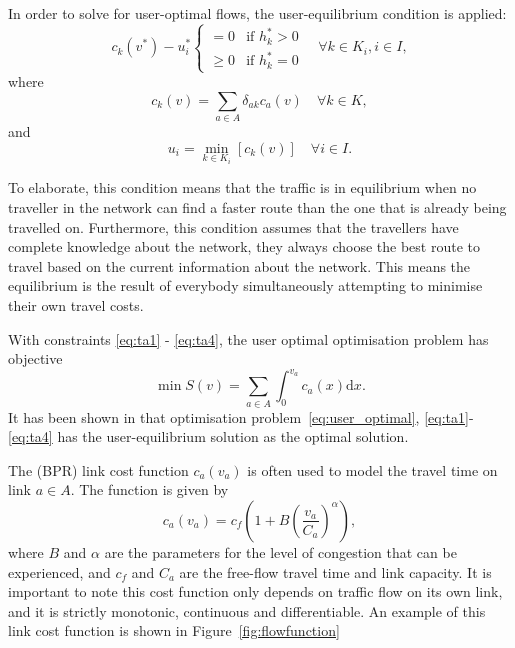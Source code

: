 In order to solve for user-optimal flows,
the \citep{Wardrop} user-equilibrium condition is applied:
\begin{equation} \label{wardrop1}
    c_k(v^{\ast}) - u_i^{\ast} 
    \begin{cases}
        =0 & \text{if } h_k^{\ast} > 0 \\
        \geq 0 & \text{if } h_k^{\ast} = 0
    \end{cases}
    \quad \forall k \in K_i, i \in I,
\end{equation}
where 
\begin{equation}
    c_k(v) = \sum_{a \in A} \delta_{ak} c_a(v) \quad \forall k \in K,
\end{equation}
and
\begin{equation} \label{wardrop3}
    u_i = \min_{k \in K_i} \left[ c_k(v) \right] \quad \forall i \in I.
\end{equation}

To elaborate, this condition means that the traffic is in equilibrium when no traveller in the network can find a faster route than the one that is already being travelled on.
Furthermore, this condition assumes that the travellers have complete knowledge about the network,
they always choose the best route to travel based on the current information about the network.
This means the equilibrium is the result of everybody simultaneously attempting to minimise their own travel costs.

With constraints \eqref{eq:ta1} - \eqref{eq:ta4},
the user optimal optimisation problem has objective
\begin{equation} \label{eq:user_optimal}
    \min S(v) = \sum_{a\in A} \int_0^{v_a} c_a(x) \mathrm{d} x.
\end{equation}
It has been shown in \citet{Florian} that optimisation problem~\eqref{eq:user_optimal}, \eqref{eq:ta1}-\eqref{eq:ta4} has the user-equilibrium solution as the optimal solution.

The \citet{BPR} (BPR) link cost function
$c_a(v_a)$ is often used to model the travel time on link $a \in A$.
The function is given by
\begin{equation}
    c_a(v_a) = c_f \left(1 + B \left( \frac{v_a}{C_a} \right)^\alpha \right),
\end{equation}
where $B$ and $\alpha$ are the parameters for the level of congestion that can be experienced,
and $c_f$ and $C_a$ are the free-flow travel time and link capacity.
It is important to note this cost function only depends on traffic flow on its own link, and it is strictly monotonic, continuous and differentiable.
An example of this link cost function is shown in Figure~\ref{fig:flowfunction}

